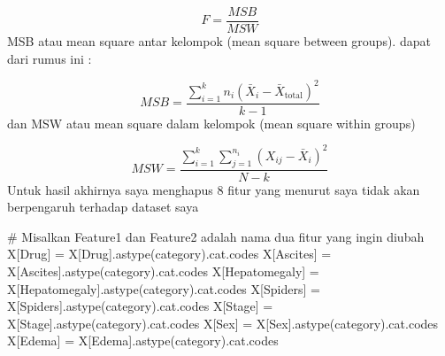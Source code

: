 \documentclass[
  letterpaper,
]{krantz}
\makeatletter
\newenvironment{Shaded}{\begin{snugshade}}{\end{snugshade}}
\newcommand{\CommentTok}[1]{\textcolor[rgb]{0.37,0.37,0.37}{#1}}
\newcommand{\NormalTok}[1]{\textcolor[rgb]{0.00,0.23,0.31}{#1}}
\newcommand{\OperatorTok}[1]{\textcolor[rgb]{0.37,0.37,0.37}{#1}}
\newcommand{\StringTok}[1]{\textcolor[rgb]{0.13,0.47,0.30}{#1}}
\newenvironment{kframe}{%
\medskip{}
\setlength{\fboxsep}{.8em}
 \def\at@end@of@kframe{}%
 \ifinner\ifhmode%
  \def\at@end@of@kframe{\end{minipage}}%
  \begin{minipage}{\columnwidth}%
 \fi\fi%
 \def\FrameCommand##1{\hskip\@totalleftmargin \hskip-\fboxsep
 \colorbox{shadecolor}{##1}\hskip-\fboxsep
     \hskip-\linewidth \hskip-\@totalleftmargin \hskip\columnwidth}%
 \MakeFramed {\advance\hsize-\width
   \@totalleftmargin\z@ \linewidth\hsize
   \@setminipage}}%
 {\par\unskip\endMakeFramed%
 \at@end@of@kframe}
\renewenvironment{Shaded}{\begin{kframe}}{\end{kframe}}
\makeatother
\begin{document}
\[
F = \frac{MSB}{MSW}
\] MSB atau mean square antar kelompok (mean square between groups).
dapat dari rumus ini :

\[
MSB = \frac{\sum_{i=1}^{k} n_i (\bar{X}_i - \bar{X}_{\text{total}})^2}{k - 1}
\] dan MSW atau mean square dalam kelompok (mean square within groups)

\[
MSW = \frac{\sum_{i=1}^{k} \sum_{j=1}^{n_i} (X_{ij} - \bar{X}_i)^2}{N - k}
\] Untuk hasil akhirnya saya menghapus 8 fitur yang menurut saya tidak
akan berpengaruh terhadap dataset saya

\begin{Shaded}
\begin{Highlighting}[]
\CommentTok{\# Misalkan \textquotesingle{}Feature1\textquotesingle{} dan \textquotesingle{}Feature2\textquotesingle{} adalah nama dua fitur yang ingin diubah}
\NormalTok{X[}\StringTok{\textquotesingle{}Drug\textquotesingle{}}\NormalTok{] }\OperatorTok{=}\NormalTok{ X[}\StringTok{\textquotesingle{}Drug\textquotesingle{}}\NormalTok{].astype(}\StringTok{\textquotesingle{}category\textquotesingle{}}\NormalTok{).cat.codes}
\NormalTok{X[}\StringTok{\textquotesingle{}Ascites\textquotesingle{}}\NormalTok{] }\OperatorTok{=}\NormalTok{ X[}\StringTok{\textquotesingle{}Ascites\textquotesingle{}}\NormalTok{].astype(}\StringTok{\textquotesingle{}category\textquotesingle{}}\NormalTok{).cat.codes}
\NormalTok{X[}\StringTok{\textquotesingle{}Hepatomegaly\textquotesingle{}}\NormalTok{] }\OperatorTok{=}\NormalTok{ X[}\StringTok{\textquotesingle{}Hepatomegaly\textquotesingle{}}\NormalTok{].astype(}\StringTok{\textquotesingle{}category\textquotesingle{}}\NormalTok{).cat.codes}
\NormalTok{X[}\StringTok{\textquotesingle{}Spiders\textquotesingle{}}\NormalTok{] }\OperatorTok{=}\NormalTok{ X[}\StringTok{\textquotesingle{}Spiders\textquotesingle{}}\NormalTok{].astype(}\StringTok{\textquotesingle{}category\textquotesingle{}}\NormalTok{).cat.codes}
\NormalTok{X[}\StringTok{\textquotesingle{}Stage\textquotesingle{}}\NormalTok{] }\OperatorTok{=}\NormalTok{ X[}\StringTok{\textquotesingle{}Stage\textquotesingle{}}\NormalTok{].astype(}\StringTok{\textquotesingle{}category\textquotesingle{}}\NormalTok{).cat.codes}
\NormalTok{X[}\StringTok{\textquotesingle{}Sex\textquotesingle{}}\NormalTok{] }\OperatorTok{=}\NormalTok{ X[}\StringTok{\textquotesingle{}Sex\textquotesingle{}}\NormalTok{].astype(}\StringTok{\textquotesingle{}category\textquotesingle{}}\NormalTok{).cat.codes}
\NormalTok{X[}\StringTok{\textquotesingle{}Edema\textquotesingle{}}\NormalTok{] }\OperatorTok{=}\NormalTok{ X[}\StringTok{\textquotesingle{}Edema\textquotesingle{}}\NormalTok{].astype(}\StringTok{\textquotesingle{}category\textquotesingle{}}\NormalTok{).cat.codes}

\end{Highlighting}
\end{Shaded}
\end{document}

